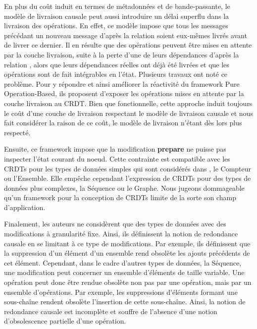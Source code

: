 En plus du coût induit en termes de métadonnées et de bande-passante, le modèle de livraison causale peut aussi introduire un délai superflu dans la livraison des opérations.
En effet, ce modèle impose que tous les messages précédant un nouveau message d'après la relation \hb soient eux-mêmes livrés avant de livrer ce dernier.
Il en résulte que des opérations peuvent être mises en attente par la couche livraison, \eg suite à la perte d'une de leurs dépendances d'après la relation \hb, alors que leurs dépendances réelles ont déjà été livrées et que les opérations sont de fait intégrables en l'état.
Plusieurs travaux \cite{2020-flec-bauwens,2021-improving-reactivity-pure-op-based-crdts-bauwens} ont noté ce problème.
Pour y répondre et ainsi améliorer la réactivité du framework Pure Operation-Based, ils proposent d'exposer les opérations mises en attente par la couche livraison au \ac{CRDT}.
Bien que fonctionnelle, cette approche induit toujours le coût d'une couche de livraison respectant le modèle de livraison causale et nous fait considérer la raison de ce coût, le modèle de livraison n'étant dès lors plus respecté.

Ensuite, ce framework impose que la modification \textbf{prepare} ne puisse pas inspecter l'état courant du noeud.
Cette contrainte est compatible avec les \acp{CRDT} pour les types de données simples qui sont considérés dans \cite{baquero2017pure}, \eg le Compteur ou l'Ensemble.
Elle empêche cependant l'expression de \acp{CRDT} pour des types de données plus complexes, \eg la Séquence ou le Graphe.
Nous jugeons dommageable qu'un framework pour la conception de \acp{CRDT} limite de la sorte son champ d'application.

Finalement, les auteurs ne considèrent que des types de données avec des modifications à granularité fixe.
Ainsi, ils définissent la notion de redondance causale en se limitant à ce type de modifications.
Par exemple, ils définissent que la suppression d'un élément d'un ensemble rend obsolète les ajouts précédents de cet élément.
Cependant, dans le cadre d'autres types de données, \eg la Séquence, une modification peut concerner un ensemble d'éléments de taille variable.
Une opération peut donc être rendue obsolète non pas par une opération, mais par un ensemble d'opérations.
Par exemple, les suppressions d'éléments formant une sous-chaîne rendent obsolète l'insertion de cette sous-chaîne.
Ainsi, la notion de redondance causale est incomplète et souffre de l'absence d'une notion d'obsolescence partielle d'une opération.


